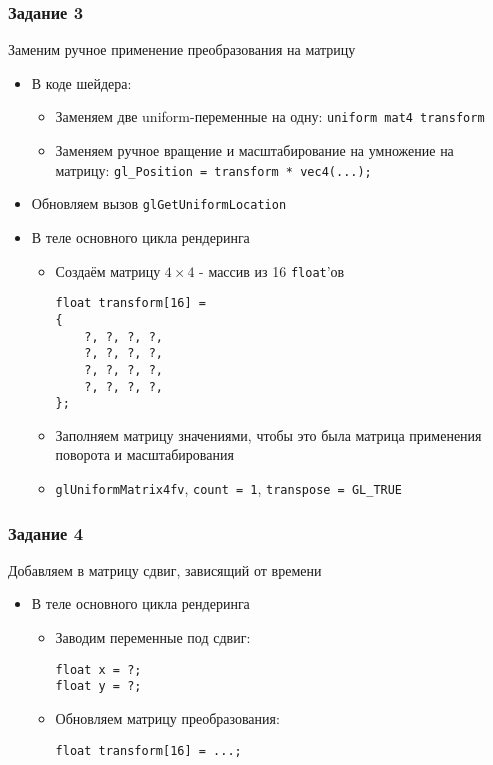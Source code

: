 \documentclass{beamer}
\begin{document}
\begin{frame}[fragile]
\frametitle{Задание 3}
Заменим ручное применение преобразования на матрицу
\begin{itemize}
\pause
\item В коде шейдера:
\begin{itemize}
\item Заменяем две uniform-переменные на одну: \verb|uniform mat4 transform|
\pause
\item Заменяем ручное вращение и масштабирование на умножение на матрицу: \verb|gl_Position = transform * vec4(...);|
\end{itemize}
\pause
\item Обновляем вызов \verb|glGetUniformLocation|
\pause
\item В теле основного цикла рендеринга
\begin{itemize}
\item Создаём матрицу \begin{math}4\times 4\end{math} - массив из 16 \verb|float|'ов
\begin{verbatim}
float transform[16] =
{
    ?, ?, ?, ?,
    ?, ?, ?, ?,
    ?, ?, ?, ?,
    ?, ?, ?, ?,
};
\end{verbatim}
\pause
\item Заполняем матрицу значениями, чтобы это была матрица применения поворота и масштабирования
\pause
\item \verb|glUniformMatrix4fv|, \verb|count = 1|, \verb|transpose = GL_TRUE|
\end{itemize}
\end{itemize}
\end{frame}

\begin{frame}[fragile]
\frametitle{Задание 4}
Добавляем в матрицу сдвиг, зависящий от времени
\begin{itemize}
\pause
\item В теле основного цикла рендеринга
\begin{itemize}
\item Заводим переменные под сдвиг:
\begin{verbatim}
float x = ?;
float y = ?;
\end{verbatim}
\pause
\item Обновляем матрицу преобразования:
\begin{verbatim}
float transform[16] = ...;
\end{verbatim}
\end{itemize}
\end{itemize}
\end{frame}
\end{document}
